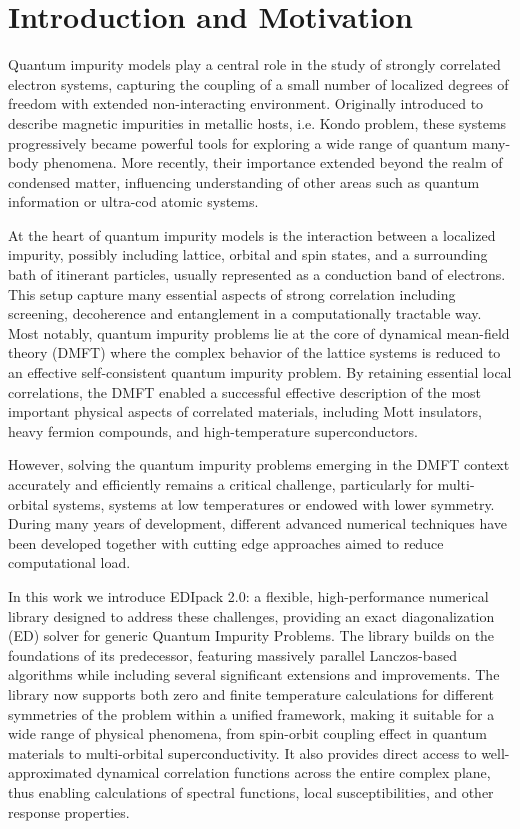 \documentclass[edipack2.tex]{subfiles}
\begin{document}
\section{Introduction and Motivation}\label{SecIntro}


Quantum impurity models play a central role in the study of strongly correlated electron systems, capturing the coupling of a small number of localized degrees of freedom with extended non-interacting environment.   
Originally introduced to describe magnetic impurities in metallic hosts, i.e. Kondo problem, these systems progressively became powerful tools for exploring a wide range of quantum many-body phenomena. More recently, their importance extended beyond the realm of condensed matter, influencing understanding of other areas such as quantum information or ultra-cod atomic systems. 

At the heart of quantum impurity models is the interaction between a localized impurity, possibly including lattice, orbital and spin states, and a surrounding bath of itinerant particles, usually represented as a conduction band of electrons. 
This setup capture many essential aspects of strong correlation including screening, decoherence and entanglement in a computationally tractable way. 
Most notably, quantum impurity problems lie at the core of dynamical mean-field theory (DMFT) where the complex behavior of the lattice systems is reduced to an effective self-consistent quantum impurity problem.  
By retaining essential local correlations, the DMFT enabled a successful effective description of the most important physical aspects of correlated materials, including Mott insulators, heavy fermion compounds, and high-temperature superconductors.  

However, solving the quantum impurity problems emerging in the DMFT context accurately and efficiently remains a
critical challenge, particularly for multi-orbital systems, systems
at low temperatures or endowed with lower symmetry. During many years of development, different advanced numerical techniques have been developed together with cutting edge approaches aimed to reduce computational load.  

In this work we introduce  EDIpack 2.0: a flexible, high-performance numerical library designed to address these challenges, providing an exact diagonalization (ED) solver for generic Quantum Impurity Problems. 
The library builds on the foundations of
its predecessor, featuring massively parallel Lanczos-based algorithms while including several significant extensions and 
improvements. The library now supports both zero and finite temperature calculations for different symmetries of the problem within a unified framework, making it suitable for a wide range of physical phenomena, from spin-orbit coupling effect in quantum materials to multi-orbital superconductivity. It also provides direct
access to well-approximated dynamical correlation functions across the
entire complex plane, thus enabling calculations of spectral functions, local susceptibilities, and
other response properties.
\end{document}
